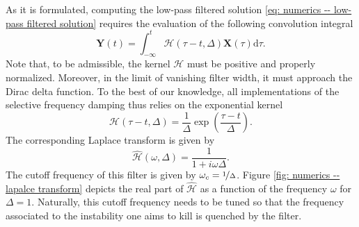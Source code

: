     As it is formulated, computing the low-pass filtered solution \eqref{eq: numerics -- low-pass filtered solution} requires the evaluation of the following convolution integral
    \begin{equation}
      \mathbf{Y}(t) = \int_{-\infty}^t \mathcal{H}(\tau-t, \Delta) \mathbf{X}(\tau) \mathrm{d}\tau.
      \label{eq: numerics -- convolution integral}
    \end{equation}
    Note that, to be admissible, the kernel $\mathcal{H}$ must be positive and properly normalized. Moreover, in the limit of vanishing filter width, it must approach the Dirac delta function. To the best of our knowledge, all implementations of the selective frequency damping thus relies on the exponential kernel
    \begin{equation}
      \mathcal{H}(\tau - t, \Delta) = \displaystyle \frac{1}{\Delta} \exp \left( \frac{\tau - t}{\Delta} \right).
      \label{eq: numerics -- exponential kernel}
    \end{equation}
    The corresponding Laplace transform is given by
    \begin{equation}
      \hat{\mathcal{H}}(\omega, \Delta) = \displaystyle \frac{1}{1 + i \omega \Delta}.
      \label{eq: numerics -- laplace transform}
    \end{equation}
    The cutoff frequency of this filter is given by $\omega_c = \nicefrac{1}{\Delta}$. Figure \ref{fig: numerics -- lapalce transform} depicts the real part of $\hat{\mathcal{H}}$ as a function of the frequency $\omega$ for $\Delta=1$. Naturally, this cutoff frequency needs to be tuned so that the frequency associated to the instability one aims to kill is quenched by the filter.

